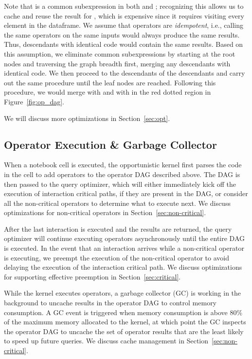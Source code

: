  Note that  is a common subexpression in both  and ; recognizing this allows us to cache and reuse the result for , which is expensive since it requires visiting every element in the dataframe. We assume that operators are \textit{idempotent}, i.e., calling the same operators on the same inputs would always produce the same results. Thus, descendants with identical code would contain the same results. Based on this assumption, we eliminate common subexpressions by starting at the root nodes and traversing the graph breadth first, merging any descendants with identical code. We then proceed to the descendants of the descendants and carry out the same procedure until the leaf nodes are reached. Following this procedure, we would merge  with  and  with  in the red dotted region in Figure~\ref{fig:op_dag}.

We will discuss more optimizations in Section~\ref{sec:opt}.

\subsection{Operator Execution \& Garbage Collector}
When a notebook cell is executed, the opportunistic kernel first parses the code in the cell to add operators to the operator DAG described above. The DAG is then passed to the query optimizer, which will either immediately kick off the execution of interaction critical paths, if they are present in the DAG, or consider all the non-critical operators to determine what to execute next. We discuss optimizations for non-critical operators in Section~\ref{sec:non-critical}.

After the last interaction is executed and the results are returned, the query optimizer will continue executing operators asynchronously until the entire DAG is executed.
In the event that an interaction arrives while a non-critical operator is executing, we preempt the execution of the non-critical operator to avoid delaying the execution of the interaction critical path. We discuss optimizations for supporting effective preemption in Section~\ref{sec:critical}.

While the kernel executes operators, a garbage collector (GC) is working in the background to uncache results in the operator DAG to control memory consumption. A GC event is triggered when memory consumption is above 80\% of the maximum memory allocated to the kernel, at which point the GC inspects the operator DAG to uncache the set of operator results that are the least likely to speed up future queries. We discuss cache management in Section~\ref{sec:non-critical}.



